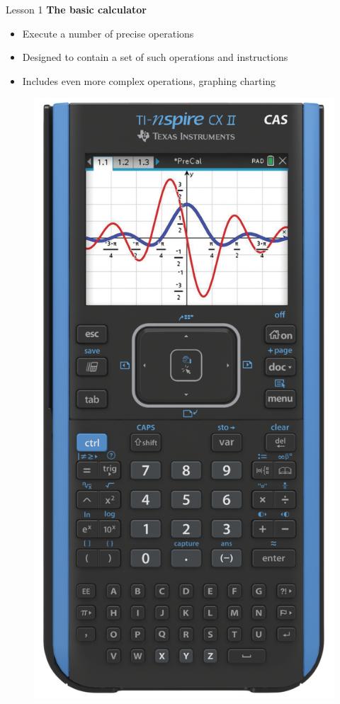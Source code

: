 \documentclass[aspectratio=1610]{beamer}
\begin{document}
\begin{frame}{Lesson 1}{}
{\Large\textbf{{The basic calculator}}}
\Large
\begin{minipage}{0.70\textwidth}
    \begin{itemize}
      \item Execute a number of precise operations
      \item Designed to contain a set of such operations and instructions
      \item Includes even more complex operations, graphing charting 
    \end{itemize}
  \end{minipage}
\begin{minipage}{.0\textwidth}
      \begin{figure}
        \includegraphics[scale=0.60]{Images/TI}

\end{figure}
\end{minipage}
\end{frame}
\end{document}
